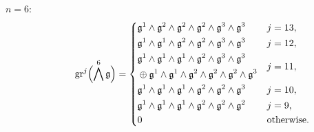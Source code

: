 \begin{description}
  \item[$n=6:$]
        \begin{equation*}
          \operatorname{gr}^{j}\Bigl( \bigwedge^{6}\mathfrak{g} \Bigr) =
          \begin{dcases}
            \mathfrak{g}^{1} \wedge \mathfrak{g}^{2} \wedge \mathfrak{g}^{2} \wedge \mathfrak{g}^{2} \wedge \mathfrak{g}^{3} \wedge \mathfrak{g}^{3} & j=13,                                                                                                                   \\
            \mathfrak{g}^{1} \wedge \mathfrak{g}^{1} \wedge \mathfrak{g}^{2} \wedge \mathfrak{g}^{2} \wedge \mathfrak{g}^{3} \wedge \mathfrak{g}^{3}                                                                                                                   & j=12, \\
            \!\begin{aligned} & \mathfrak{g}^{1} \wedge \mathfrak{g}^{1} \wedge \mathfrak{g}^{1} \wedge \mathfrak{g}^{2} \wedge \mathfrak{g}^{3} \wedge \mathfrak{g}^{3} \\ & \oplus \mathfrak{g}^{1} \wedge \mathfrak{g}^{1} \wedge \mathfrak{g}^{2} \wedge \mathfrak{g}^{2} \wedge \mathfrak{g}^{2} \wedge \mathfrak{g}^{3} \end{aligned} & j=11, \\
            \mathfrak{g}^{1} \wedge \mathfrak{g}^{1} \wedge \mathfrak{g}^{1} \wedge \mathfrak{g}^{2} \wedge \mathfrak{g}^{2} \wedge \mathfrak{g}^{3}                                                                                                                   & j=10, \\
            \mathfrak{g}^{1} \wedge \mathfrak{g}^{1} \wedge \mathfrak{g}^{1} \wedge \mathfrak{g}^{2} \wedge \mathfrak{g}^{2} \wedge \mathfrak{g}^{2}                                                                                                                   & j=9,  \\
            0                                                                                                                                                                                                & \text{otherwise.}
          \end{dcases}
        \end{equation*}



\end{description}
